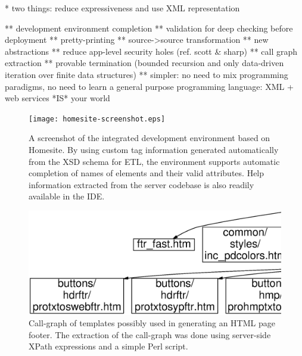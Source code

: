 \documentclass{www2003-submission}
\begin{document}
* two things: reduce expressiveness and use XML representation

** development environment completion
** validation for deep checking before deployment
** pretty-printing 
** source->source transformation 
** new abstractions 
** reduce app-level security holes (ref. scott \& sharp)
** call graph extraction
** provable termination (bounded recursion and only data-driven iteration over finite data structures)
** simpler: no need to mix programming paradigms, no need to learn a general purpose programming language: XML + web services *IS* your world

\begin{figure}[tb]
\begin{centering}
\hspace*{-0.05\linewidth}\texttt{[image: homesite-screenshot.eps]}
\caption{A screenshot of the integrated development environment based
on Homesite.  By using custom tag information generated automatically
from the XSD schema for ETL, the environment supports automatic
completion of names of elements and their valid attributes.  Help
information extracted from the server codebase is also readily
available in the IDE\@.
\label{fig-homesite-screenshot}}
\end{centering}
\end{figure}



\begin{figure}[bt]
\begin{centering}
\hspace*{-.03\linewidth}\includegraphics[width=1.06\linewidth]{ftr_fast-call-graph.eps}
\caption{Call-graph of templates possibly used in generating an HTML
page footer.  The extraction of the call-graph was done using
server-side XPath expressions and a simple Perl script. \label{fig-call-graph}}
\end{centering}
\end{figure}
\end{document}
